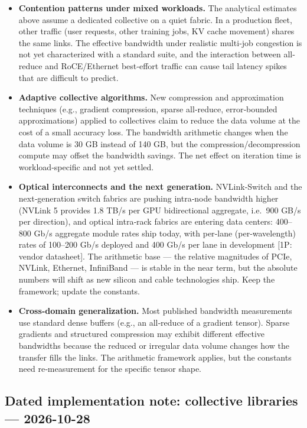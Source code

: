 \begin{itemize}
\item
  \textbf{Contention patterns under mixed workloads.} The analytical
  estimates above assume a dedicated collective on a quiet fabric. In a
  production fleet, other traffic (user requests, other training jobs,
  KV cache movement) shares the same links. The effective bandwidth
  under realistic multi‑job congestion is not yet characterized with a
  standard suite, and the interaction between all-reduce and
  RoCE/Ethernet best‑effort traffic can cause tail latency spikes that
  are difficult to predict.
\item
  \textbf{Adaptive collective algorithms.} New compression and
  approximation techniques (e.g., gradient compression, sparse
  all‑reduce, error‑bounded approximations) applied to collectives claim
  to reduce the data volume at the cost of a small accuracy loss. The
  bandwidth arithmetic changes when the data volume is 30 GB instead of
  140 GB, but the compression/decompression compute may offset the
  bandwidth savings. The net effect on iteration time is
  workload‑specific and not yet settled.
\item
  \textbf{Optical interconnects and the next generation.} NVLink‑Switch
  and the next‑generation switch fabrics are pushing intra‑node
  bandwidth higher (NVLink 5 provides 1.8 TB/s per GPU bidirectional
  aggregate, i.e.~900 GB/s per direction), and optical intra‑rack
  fabrics are entering data centers: 400--800 Gb/s aggregate module
  rates ship today, with per‑lane (per‑wavelength) rates of 100--200
  Gb/s deployed and 400 Gb/s per lane in development {[}1P: vendor
  datasheet{]}. The arithmetic base --- the relative magnitudes of PCIe,
  NVLink, Ethernet, InfiniBand --- is stable in the near term, but the
  absolute numbers will shift as new silicon and cable technologies
  ship. Keep the framework; update the constants.
\item
  \textbf{Cross‑domain generalization.} Most published bandwidth
  measurements use standard dense buffers (e.g., an all‑reduce of a
  gradient tensor). Sparse gradients and structured compression may
  exhibit different effective bandwidths because the reduced or
  irregular data volume changes how the transfer fills the links. The
  arithmetic framework applies, but the constants need re‑measurement
  for the specific tensor shape.
\end{itemize}

\subsection*{Dated implementation note: collective libraries ---
2026-10-28}\label{dated-implementation-note-collective-libraries-2026-10-28}

